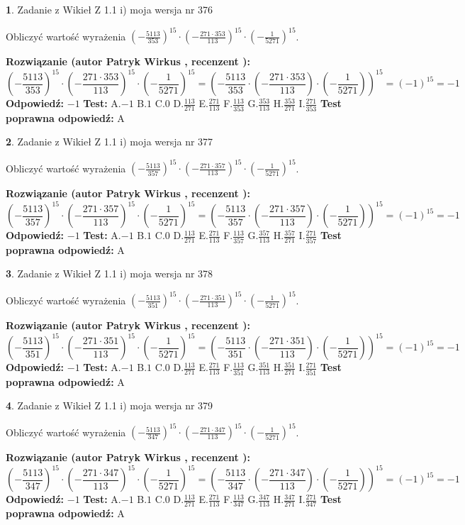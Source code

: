 \documentclass[12pt, a4paper]{article}
\theoremstyle{definition} %
\newtheorem{zad}{}
\newcommand{\zadStart}[1]{\begin{zad}#1\newline}
\newcommand{\zadStop}{\end{zad}}
\newcommand{\rozwStart}[2]{\noindent \textbf{Rozwiązanie (autor #1 , recenzent #2): }\newline}
\newcommand{\rozwStop}{\newline}
\newcommand{\odpStart}{\noindent \textbf{Odpowiedź:}\newline}
\newcommand{\odpStop}{\newline}
\newcommand{\testStart}{\noindent \textbf{Test:}\newline}
\newcommand{\testStop}{\newline}
\newcommand{\kluczStart}{\noindent \textbf{Test poprawna odpowiedź:}\newline}
\newcommand{\kluczStop}{\newline}
\begin{document}
\zadStart{Zadanie z Wikieł Z 1.1 i) moja wersja nr 376}

Obliczyć wartość wyrażenia $(-\frac{5113}{353})^{15} \cdot (-\frac{271 \cdot 353}{113})^{15} \cdot (-\frac{1}{5271})^{15}$.
\zadStop
\rozwStart{Patryk Wirkus}{}
$$(-\frac{5113}{353})^{15} \cdot (-\frac{271 \cdot 353}{113})^{15} \cdot (-\frac{1}{5271})^{15} = (-\frac{5113}{353} \cdot (-\frac{271 \cdot 353}{113}) \cdot (-\frac{1}{5271}))^{15} = (-1)^{15} = -1$$
\rozwStop
\odpStart
$-1$
\odpStop
\testStart
A.$-1$ B.$1$ C.$0$ D.$\frac{113}{271}$ E.$\frac{271}{113}$
F.$\frac{113}{353}$ G.$\frac{353}{113}$
H.$\frac{353}{271}$
I.$\frac{271}{353}$
\testStop
\kluczStart
A
\kluczStop



\zadStart{Zadanie z Wikieł Z 1.1 i) moja wersja nr 377}

Obliczyć wartość wyrażenia $(-\frac{5113}{357})^{15} \cdot (-\frac{271 \cdot 357}{113})^{15} \cdot (-\frac{1}{5271})^{15}$.
\zadStop
\rozwStart{Patryk Wirkus}{}
$$(-\frac{5113}{357})^{15} \cdot (-\frac{271 \cdot 357}{113})^{15} \cdot (-\frac{1}{5271})^{15} = (-\frac{5113}{357} \cdot (-\frac{271 \cdot 357}{113}) \cdot (-\frac{1}{5271}))^{15} = (-1)^{15} = -1$$
\rozwStop
\odpStart
$-1$
\odpStop
\testStart
A.$-1$ B.$1$ C.$0$ D.$\frac{113}{271}$ E.$\frac{271}{113}$
F.$\frac{113}{357}$ G.$\frac{357}{113}$
H.$\frac{357}{271}$
I.$\frac{271}{357}$
\testStop
\kluczStart
A
\kluczStop



\zadStart{Zadanie z Wikieł Z 1.1 i) moja wersja nr 378}

Obliczyć wartość wyrażenia $(-\frac{5113}{351})^{15} \cdot (-\frac{271 \cdot 351}{113})^{15} \cdot (-\frac{1}{5271})^{15}$.
\zadStop
\rozwStart{Patryk Wirkus}{}
$$(-\frac{5113}{351})^{15} \cdot (-\frac{271 \cdot 351}{113})^{15} \cdot (-\frac{1}{5271})^{15} = (-\frac{5113}{351} \cdot (-\frac{271 \cdot 351}{113}) \cdot (-\frac{1}{5271}))^{15} = (-1)^{15} = -1$$
\rozwStop
\odpStart
$-1$
\odpStop
\testStart
A.$-1$ B.$1$ C.$0$ D.$\frac{113}{271}$ E.$\frac{271}{113}$
F.$\frac{113}{351}$ G.$\frac{351}{113}$
H.$\frac{351}{271}$
I.$\frac{271}{351}$
\testStop
\kluczStart
A
\kluczStop



\zadStart{Zadanie z Wikieł Z 1.1 i) moja wersja nr 379}

Obliczyć wartość wyrażenia $(-\frac{5113}{347})^{15} \cdot (-\frac{271 \cdot 347}{113})^{15} \cdot (-\frac{1}{5271})^{15}$.
\zadStop
\rozwStart{Patryk Wirkus}{}
$$(-\frac{5113}{347})^{15} \cdot (-\frac{271 \cdot 347}{113})^{15} \cdot (-\frac{1}{5271})^{15} = (-\frac{5113}{347} \cdot (-\frac{271 \cdot 347}{113}) \cdot (-\frac{1}{5271}))^{15} = (-1)^{15} = -1$$
\rozwStop
\odpStart
$-1$
\odpStop
\testStart
A.$-1$ B.$1$ C.$0$ D.$\frac{113}{271}$ E.$\frac{271}{113}$
F.$\frac{113}{347}$ G.$\frac{347}{113}$
H.$\frac{347}{271}$
I.$\frac{271}{347}$
\testStop
\kluczStart
A
\kluczStop
\end{document}
